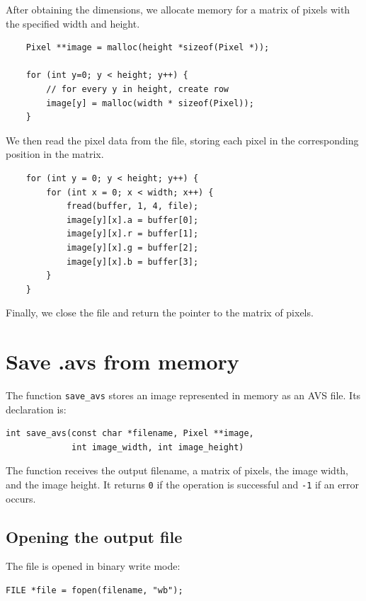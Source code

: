 After obtaining the dimensions, we allocate memory for a matrix of pixels with the specified width and height. 

\begin{lstlisting}
    Pixel **image = malloc(height *sizeof(Pixel *));

    for (int y=0; y < height; y++) {
        // for every y in height, create row
        image[y] = malloc(width * sizeof(Pixel));
    }
\end{lstlisting}

We then read the pixel data from the file, storing each pixel in the corresponding position in the matrix.

\begin{lstlisting}
    for (int y = 0; y < height; y++) {
        for (int x = 0; x < width; x++) {
            fread(buffer, 1, 4, file);
            image[y][x].a = buffer[0];
            image[y][x].r = buffer[1];
            image[y][x].g = buffer[2];
            image[y][x].b = buffer[3];
        }
    }
\end{lstlisting}


Finally, we close the file and return the pointer to the matrix of pixels.


\section{Save .avs from memory}

The function \texttt{save\_avs} stores an image represented in memory as an AVS
file. Its declaration is:

\begin{lstlisting}
int save_avs(const char *filename, Pixel **image,
             int image_width, int image_height)
\end{lstlisting}

The function receives the output filename, a matrix of pixels, the image width,
and the image height. It returns \texttt{0} if the operation is successful and
\texttt{-1} if an error occurs.

\subsection{Opening the output file}

The file is opened in binary write mode:

\begin{lstlisting}
FILE *file = fopen(filename, "wb");
\end{lstlisting}

